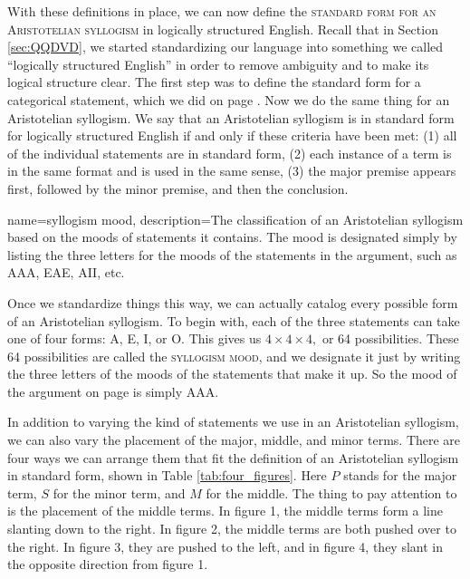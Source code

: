 With these definitions in place, we can now define the \textsc{\gls{standard form for an Aristotelian syllogism}} in logically structured English. \label{standard_form_for_an_Aristotelian_syllogism} Recall that in Section  \ref{sec:QQDVD}, we started standardizing our language into something we called ``logically structured English'' in order to remove ambiguity and to make its logical structure clear. The first step was to define the standard form for a categorical statement, which we did on page \pageref{def:standard_form_cat_statement}. Now we do the same thing for an Aristotelian syllogism. We say that an Aristotelian syllogism is in standard form for logically structured English if and only if these criteria have been met: (1) all of the individual statements are in standard form, (2) each instance of a term is in the same format and is used in the same sense, (3) the major premise appears first, followed by the minor premise, and then the conclusion.

{
name=syllogism mood,
description={The classification of an Aristotelian syllogism based on the moods of statements it contains. The mood is designated simply by listing the three letters for the moods of the statements in the argument, such as AAA, EAE, AII, etc.}
} 

Once we standardize things this way, we can actually catalog every possible form of an Aristotelian syllogism. To begin with, each of the three statements can take one of four forms: A, E, I, or O. This gives us $4 \times 4 \times 4,$ or 64 possibilities. These 64 possibilities are called the \textsc{\gls{syllogism mood}}, and we designate it just by writing the three letters of the moods of the statements that make it up. So the mood of the argument on page \pageref{AAA_arg} is simply AAA. 

In addition to varying the kind of statements we use in an Aristotelian syllogism, we can also vary the placement of the major, middle, and minor terms. There are four ways we can arrange them that fit the definition of an Aristotelian syllogism in standard form, shown in Table \ref{tab:four_figures}. Here $P$ stands for the major term, $S$ for the minor term, and $M$ for the middle. The thing to pay attention to is the placement of the middle terms. In figure 1, the middle terms form a line slanting down to the right. In figure 2, the middle terms are both pushed over to the right. In figure 3, they are pushed to the left, and in figure 4, they slant in the opposite direction from figure 1.


